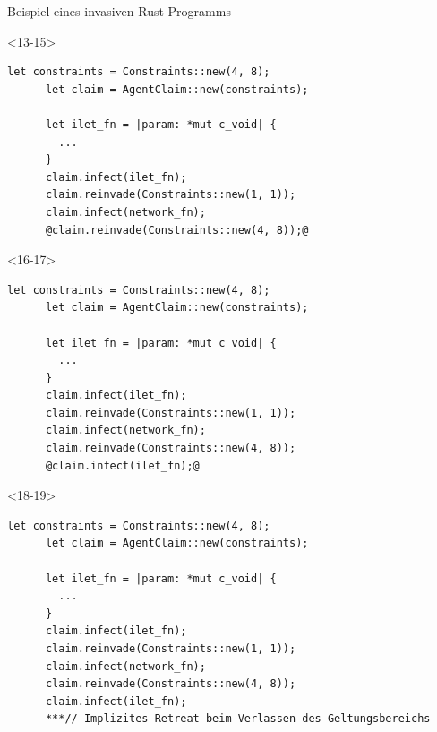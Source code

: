 \begin{frame}[fragile]{Beispiel eines invasiven Rust-Programms}
  \begin{onlyenv}<13-15>
    \begin{lstlisting}[frame=single,style=base]
      let constraints = Constraints::new(4, 8);
      let claim = AgentClaim::new(constraints);

      let ilet_fn = |param: *mut c_void| {
        ...
      }
      claim.infect(ilet_fn);
      claim.reinvade(Constraints::new(1, 1));
      claim.infect(network_fn);
      @claim.reinvade(Constraints::new(4, 8));@

      \end{lstlisting}
  \end{onlyenv}

  \begin{onlyenv}<16-17>
    \begin{lstlisting}[frame=single,style=base]
      let constraints = Constraints::new(4, 8);
      let claim = AgentClaim::new(constraints);

      let ilet_fn = |param: *mut c_void| {
        ...
      }
      claim.infect(ilet_fn);
      claim.reinvade(Constraints::new(1, 1));
      claim.infect(network_fn);
      claim.reinvade(Constraints::new(4, 8));
      @claim.infect(ilet_fn);@
      \end{lstlisting}
  \end{onlyenv}

  \begin{onlyenv}<18-19>
    \begin{lstlisting}[frame=single,style=base]
      let constraints = Constraints::new(4, 8);
      let claim = AgentClaim::new(constraints);

      let ilet_fn = |param: *mut c_void| {
        ...
      }
      claim.infect(ilet_fn);
      claim.reinvade(Constraints::new(1, 1));
      claim.infect(network_fn);
      claim.reinvade(Constraints::new(4, 8));
      claim.infect(ilet_fn);
      ***// Implizites Retreat beim Verlassen des Geltungsbereichs\end{lstlisting}
  \end{onlyenv}




  

\end{frame}